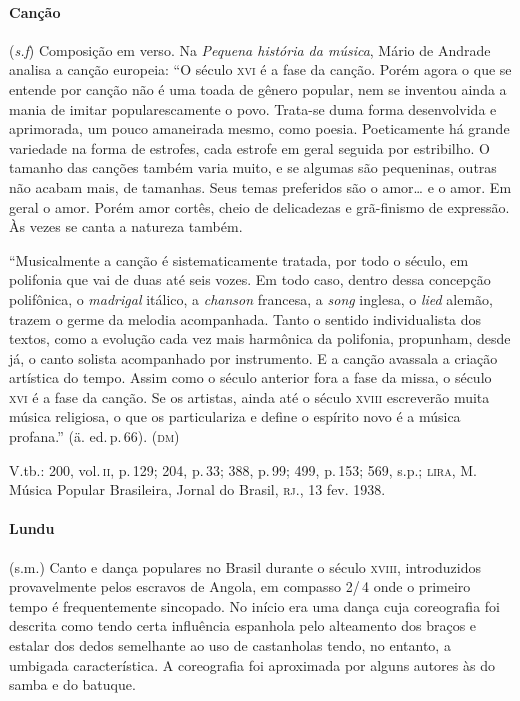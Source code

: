 \paragraph{Canção} (\emph{s.f}) Composição em verso. Na \emph{Pequena
história da música}, Mário de Andrade analisa a canção europeia: ``O
século \textsc{xvi} é a fase da canção. Porém agora o que se entende por canção não
é uma toada de gênero popular, nem se inventou ainda a mania de imitar
popularescamente o povo. Trata-se duma forma desenvolvida e aprimorada,
um pouco amaneirada mesmo, como poesia. Poeticamente há grande variedade
na forma de estrofes, cada estrofe em geral seguida por estribilho. O
tamanho das canções também varia muito, e se algumas são pequeninas,
outras não acabam mais, de tamanhas. Seus temas preferidos são o
amor\ldots{} e o amor. Em geral o amor. Porém amor cortês, cheio de
delicadezas e grã-finismo de expressão. Às vezes se canta a natureza
também.

``Musicalmente a canção é sistematicamente tratada, por todo o século,
em polifonia que vai de duas até seis vozes. Em todo caso, dentro dessa
concepção polifônica, o \textit{madrigal} itálico, a \textit{chanson} francesa, a \textit{song}
inglesa, o \textit{lied} alemão, trazem o germe da melodia acompanhada. Tanto o
sentido individualista dos textos, como a evolução cada vez mais
harmônica da polifonia, propunham, desde já, o canto solista acompanhado
por instrumento. E a canção avassala a criação artística do tempo. Assim
como o século anterior fora a fase da missa, o século \textsc{xvi} é a fase da
canção. Se os artistas, ainda até o século \textsc{xviii} escreverão muita música
religiosa, o que os particulariza e define o espírito novo é a música
profana.'' (ä. ed.\,p.\,66). (\textsc{dm})

V.tb.: 200, vol.\,\textsc{ii}, p.\,129; 204, p.\,33; 388, p.\,99; 499, p.\,153; 569,
s.p.; \textsc{lira}, M. Música Popular Brasileira, Jornal do Brasil, \textsc{rj}., 13 fev.
1938.

\paragraph{Lundu} (s.m.) Canto e dança populares no Brasil durante o século
\textsc{xviii}, introduzidos provavelmente pelos escravos de Angola, em compasso
2/\,4 onde o primeiro tempo é frequentemente sincopado. No início era uma
dança cuja coreografia foi descrita como tendo certa influência
espanhola pelo alteamento dos braços e estalar dos dedos semelhante ao
uso de castanholas tendo, no entanto, a umbigada característica. A
coreografia foi aproximada por alguns autores às do samba e do
batuque.

